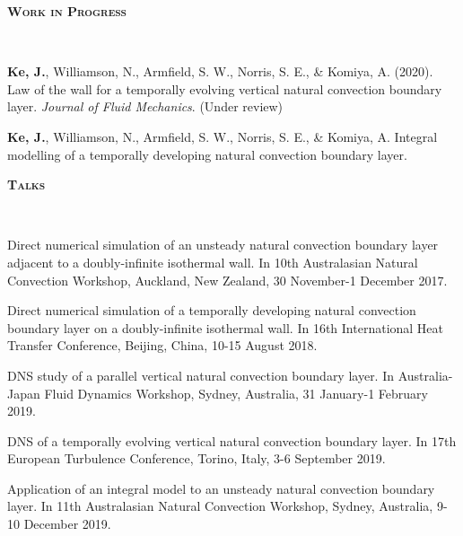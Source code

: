 \documentclass[letterpaper, 10pt]{article}
\newenvironment{changemargin}[2]{%
  \begin{list}{}{%
      \setlength{\topsep}{0pt}%
      \setlength{\leftmargin}{#1}%
      \setlength{\rightmargin}{#2}%
      \setlength{\listparindent}{\parindent}%
      \setlength{\itemindent}{\parindent}%
      \setlength{\parsep}{\parskip}%
    }%
  \item[]}{\end{list}
}
\newcommand{\lineover}{
  \begin{changemargin}{-0.05in}{-0.05in}
    \vspace*{-8pt}
    \hrulefill \\
    \vspace*{-2pt}
  \end{changemargin}
}
\newcommand{\header}[1]{
  \begin{changemargin}{-0.5in}{-0.5in}
    \textbf{\scshape{#1}}\\
    \lineover
  \end{changemargin}
}
\newenvironment{body} {
  \vspace*{-16pt}
  \begin{changemargin}{-0.25in}{-0.5in}
  }
  {\end{changemargin}
}
\begin{document}
\header{Work in Progress}
\begin{body}
  \vspace{14pt}

  \textbf{Ke, J.}, Williamson, N., Armfield, S. W., Norris, S. E., \& Komiya, A.  (2020). Law of the wall for a temporally evolving vertical natural convection boundary layer. \emph{Journal of Fluid Mechanics}. (Under review)

  \smallskip

  \textbf{Ke, J.}, Williamson, N., Armfield, S. W., Norris, S. E., \& Komiya, A.  Integral modelling of a temporally developing natural convection boundary layer.

  \smallskip

\end{body}
\smallskip

\header{Talks}
\begin{body}
  \vspace{14pt}

  Direct numerical simulation of an unsteady natural convection boundary layer adjacent to a doubly-infinite isothermal wall. In 10th Australasian Natural Convection Workshop, Auckland, New Zealand, 30 November-1 December 2017.

  \smallskip

  Direct numerical simulation of a temporally developing natural convection boundary layer on a doubly-infinite isothermal wall. In 16th International Heat Transfer Conference, Beijing, China, 10-15 August 2018. 
  
  \smallskip
  
  DNS study of a parallel vertical natural convection boundary layer. In Australia-Japan Fluid Dynamics Workshop, Sydney, Australia, 31 January-1 February 2019.
  
  \smallskip
  
  DNS of a temporally evolving vertical natural convection boundary layer. In 17th European Turbulence Conference, Torino, Italy, 3-6 September 2019.
  
  \smallskip
  
  Application of an integral model to an unsteady natural convection boundary layer. In 11th Australasian Natural Convection Workshop, Sydney, Australia, 9-10 December 2019.
  
  \smallskip
  
  

\end{body}
\smallskip
\end{document}
